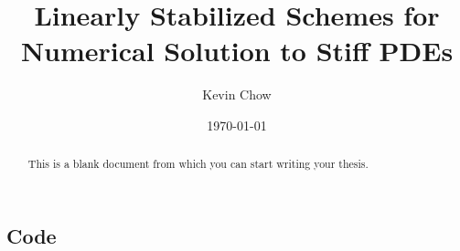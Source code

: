 \documentclass{sfuthesis}
\title{Linearly Stabilized Schemes for Numerical Solution to Stiff PDEs}
\author{Kevin Chow}
\date{\today}
\theoremstyle{plain}
\theoremstyle{definition}
\theoremstyle{remark}
\begin{document}
\frontmatter
\maketitle{}
\makecommittee{}

\begin{abstract}
	This is a blank document from which you can start writing your thesis.
\end{abstract}


\begin{dedication} %
\end{dedication}


\begin{acknowledgements} %
\end{acknowledgements}

\tableofcontents\clearpage
{}\listoftables\clearpage
{}\listoffigures





%
%

\mainmatter%










%
%
%
%
%

\backmatter%
	

\begin{appendices} %
	\chapter{Code}
\end{appendices}
\end{document}
